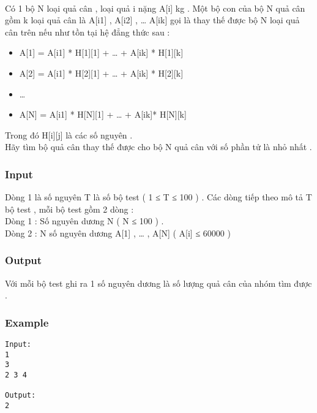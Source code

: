 

 

Có 1 bộ N loại quả cân , loại quả i nặng A[i] kg . Một bộ con của bộ N quả cân gồm k loại quả cân là A[i1] , A[i2] , … A[ik] gọi là thay thế được bộ N loại quả cân trên nếu như tồn tại hệ đẳng thức sau :
\begin{itemize}
	\item A[1] = A[i1] * H[1][1] + … + A[ik] * H[1][k]
	\item A[2] = A[i1] * H[2][1] + … + A[ik] * H[2][k]
	\item …
	\item A[N] = A[i1] * H[N][1] + … + A[ik]* H[N][k]
\end{itemize}

Trong đó H[i][j] là các số nguyên .
\\Hãy tìm bộ quả cân thay thế được cho bộ N quả cân với số phần tử là nhỏ nhất .

\subsubsection{Input}

Dòng 1 là số nguyên T là số bộ test ( 1 ≤ T ≤ 100 ) . Các dòng tiếp theo mô tả T bộ test , mỗi bộ test gồm 2 dòng :
\\Dòng 1 : Số nguyên dương N ( N ≤ 100 ) .
\\Dòng 2 : N số nguyên dương A[1] , … , A[N] ( A[i] ≤ 60000 )

\subsubsection{Output}

Với mỗi bộ test ghi ra 1 số nguyên dương là số lượng quả cân của nhóm tìm được .

\subsubsection{Example}
\begin{verbatim}
Input:
1
3
2 3 4

Output:
2
\end{verbatim}